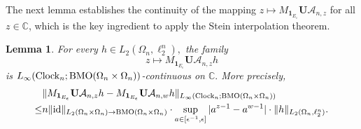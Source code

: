 \documentclass{amsart}
\numberwithin{equation}{section}
\newtheorem{lem}[thm]{Lemma}
\theoremstyle{definition}
\theoremstyle{remark}
\newcommand{\1}{\mathbf 1}
\newcommand{\BMO}{\mathrm{BMO}}
\begin{document}
The next lemma establishes the continuity of the mapping $z\mapsto M_{\1_{E_{\varepsilon}}}\mathbf{U}\mathcal{A}_{n,z}$ for all $z\in \mathbb{C}$, which is the key ingredient to apply the Stein interpolation theorem.
\begin{lem}\label{final continuity lemma} For every $h\in L_2(\Omega_n,\ell^{n}_{2}),$ the family
$$
 z\longmapsto M_{\1_{E_{\epsilon}}}\mathbf{U}\mathcal{A}_{n,z}h
$$
is $L_{\infty}({\rm Clock}_n;\BMO(\Omega_n\times\Omega_n))$-continuous on $\mathbb{C}.$ More precisely,
\begin{align*}
&\|M_{\1_{E_{\epsilon}}}\mathbf{U}\mathcal{A}_{n,z}h-M_{\mathbf{1}_{E_{\epsilon}}}\mathbf{U}\mathcal{A}_{n,w}h\|_{L_{\infty}({\rm Clock}_n;\BMO(\Omega_n\times\Omega_n))}\\
\leq & n\|{\rm id}\|_{L_2(\Omega_n\times\Omega_n)\to\BMO(\Omega_n\times\Omega_n)}\cdot \sup_{a\in[\epsilon^{-1},\epsilon]}|a^{z-1}-a^{w-1}|\cdot\|h\|_{L_2(\Omega_n,\ell^{n}_{2})}.
\end{align*}
\end{lem}
\end{document}
